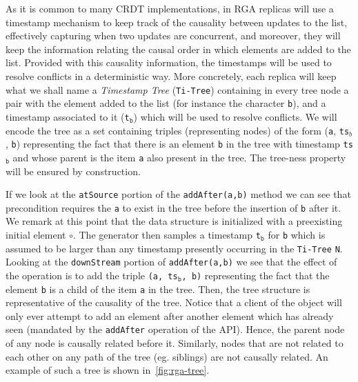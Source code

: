 As it is common to many CRDT implementations, in RGA replicas will use
a timestamp mechanism to keep track of the causality between updates
to the list, effectively capturing when two updates are concurrent,
and moreover, they will keep the information relating the causal order
in which elements are added to the list.
%
Provided with this causality information, the timestamps will be used
to resolve conflicts in a deterministic way.
%
More concretely, each replica will keep what we shall name a
\emph{Timestamp Tree} (\lstinline|Ti-Tree|) containing in every tree
node a pair with the element added to the list (for instance the
character \lstinline|b|), and a timestamp associated to it
(\lstinline|t|$_{\mathtt{b}}$) which will be used to resolve
conflicts.
%
We will encode the tree as a set containing triples (representing
nodes) of the form (\lstinline|a|, \lstinline|ts|$_{b}$, \lstinline|b|)
representing the fact that there is an element \lstinline|b| in the
tree with timestamp \lstinline|ts|$_{\mathtt{b}}$ and whose parent is the item
\lstinline|a| also present in the tree.
%
The tree-ness property will be ensured by construction.


If we look at the \lstinline|atSource| portion of the
\lstinline|addAfter(a,b)| method we can see that precondition requires
the \lstinline|a| to exist in the tree before the insertion of
\lstinline|b| after it.
%
We remark at this point that the data structure is initialized with a
preexisting initial element $\circ$.
%
The generator then samples a timestamp \lstinline|t|$_{\mathtt{b}}$
for \lstinline|b| which is assumed to be larger than any
timestamp presently occurring in the \lstinline|Ti-Tree|
\lstinline|N|.
%
Looking at the \lstinline|downStream| portion of
\lstinline|addAfter(a,b)| we see that the effect of the operation is
to add the triple \lstinline|(a, ts|$_{\mathtt{b}}$\lstinline|, b)|
representing the fact that the element \lstinline|b| is a child of the
item \lstinline|a| in the tree.
%
Then, the tree structure is representative of the causality of the
tree.
%
Notice that a client of the object will only ever attempt to add an
element after another element which has already seen (mandated by the
\lstinline|addAfter| operation of the API).
%
Hence, the parent node of any node is causally related before it.
%
Similarly, nodes that are not related to each other on any path of
the tree (eg. siblings) are not causally related.
%
An example of such a tree is shown in~\ref{fig:rga-tree}.
%

